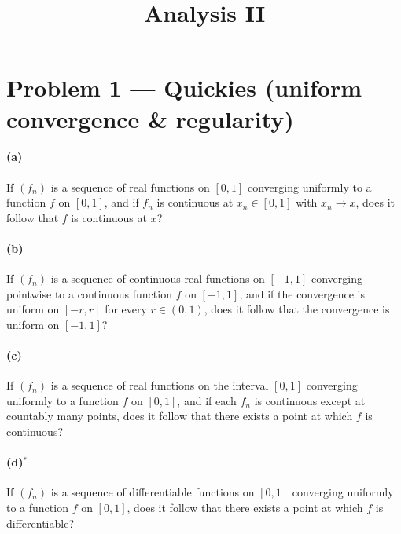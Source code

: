 \documentclass[12pt,a4paper]{article}
\title{\Large Analysis II}
\author{}
\date{}
\theoremstyle{plain}
\theoremstyle{definition}
\theoremstyle{remark}
\theoremstyle{remark}
\begin{document}
	
	\maketitle
	
	
\section*{Problem 1 — Quickies (uniform convergence \& regularity)}

\paragraph{(a)} If $(f_n)$ is a sequence of real functions on $[0,1]$ converging uniformly to a function $f$ on $[0,1]$, and if $f_n$ is continuous at $x_n\in[0,1]$ with $x_n\to x$, does it follow that $f$ is continuous at $x$?

\paragraph{(b)} If $(f_n)$ is a sequence of continuous real functions on $[-1,1]$ converging pointwise to a continuous function $f$ on $[-1,1]$, and if the convergence is uniform on $[-r,r]$ for every $r\in(0,1)$, does it follow that the convergence is uniform on $[-1,1]$?

\paragraph{(c)} If $(f_n)$ is a sequence of real functions on the interval $[0,1]$ converging uniformly to a function $f$ on $[0,1]$, and if each $f_n$ is continuous except at countably many points, does it follow that there exists a point at which $f$ is continuous?

\paragraph{(d)$^\ast$} If $(f_n)$ is a sequence of differentiable functions on $[0,1]$ converging uniformly to a function $f$ on $[0,1]$, does it follow that there exists a point at which $f$ is differentiable?

\bigskip
\end{document}

